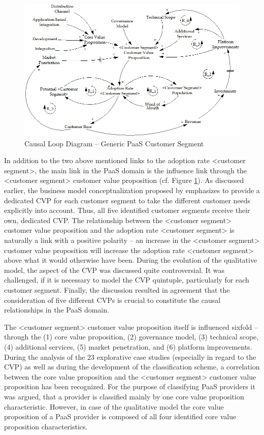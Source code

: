 \begin{figure}[tb]
	\centering
	\includegraphics[width=\textwidth]{gfx/cld_customerSegment}
	\caption{Causal Loop Diagram -- Generic PaaS Customer Segment}
	\label{fig:cld_cs}
\end{figure}

In addition to the two above mentioned links to the adoption rate <customer segment>, the main link in the \ac{PaaS} domain is the influence link through the <customer segment> customer value proposition (cf. Figure \ref{fig:cld_cs}). As discussed earlier, the business model conceptualization proposed by \citet{Johnson2008} emphasizes to provide a dedicated \ac{CVP} for each customer segment to take the different customer needs explicitly into account. Thus, all five identified customer segments receive their own, dedicated \ac{CVP}. The relationship between the <customer segment> customer value proposition and the adoption rate <customer segment> is naturally a link with a positive polarity -- an increase in the <customer segment> customer value proposition will increase the adoption rate <customer segment> above what it would otherwise have been. During the evolution of the qualitative model, the aspect of the \ac{CVP} was discussed quite controversial. It was challenged, if it is necessary to model the \ac{CVP} quintuple, particularly for each customer segment. Finally, the discussion resulted in agreement that the consideration of five different \acp{CVP} is crucial to constitute the causal relationships in the \ac{PaaS} domain.

The <customer segment> customer value proposition itself is influenced sixfold -- through the (1) core value proposition, (2) governance model, (3) technical scope, (4) additional services, (5) market penetration, and (6) platform improvements. During the analysis of the 23 explorative case studies (especially in regard to the \ac{CVP}) as well as during the development of the classification scheme, a correlation between the core value proposition and the <customer segment> customer value proposition has been recognized. For the purpose of classifying \ac{PaaS} providers it was argued, that a provider is classified mainly by one core value proposition characteristic. However, in case of the qualitative model the core value proposition of a \ac{PaaS} provider is composed of all four identified core value proposition characteristics.

